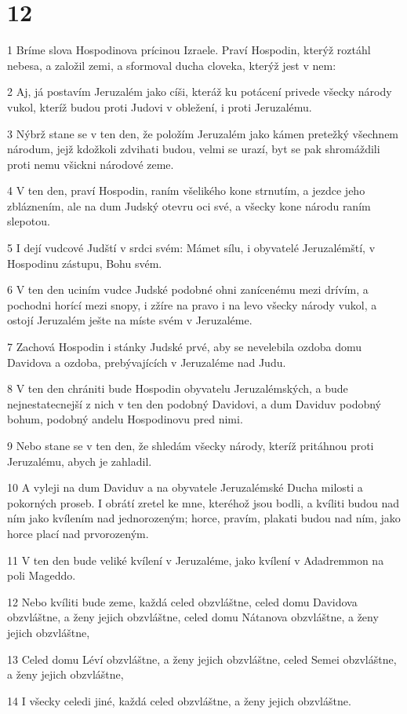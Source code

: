\chapter{12}

\par 1 Bríme slova Hospodinova prícinou Izraele. Praví Hospodin, kterýž roztáhl nebesa, a založil zemi, a sformoval ducha cloveka, kterýž jest v nem:
\par 2 Aj, já postavím Jeruzalém jako cíši, kteráž ku potácení privede všecky národy vukol, kteríž budou proti Judovi v obležení, i proti Jeruzalému.
\par 3 Nýbrž stane se v ten den, že položím Jeruzalém jako kámen pretežký všechnem národum, jejž kdožkoli zdvihati budou, velmi se urazí, byt se pak shromáždili proti nemu všickni národové zeme.
\par 4 V ten den, praví Hospodin, raním všelikého kone strnutím, a jezdce jeho zbláznením, ale na dum Judský otevru oci své, a všecky kone národu raním slepotou.
\par 5 I dejí vudcové Judští v srdci svém: Mámet sílu, i obyvatelé Jeruzalémští, v Hospodinu zástupu, Bohu svém.
\par 6 V ten den uciním vudce Judské podobné ohni zanícenému mezi drívím, a pochodni horící mezi snopy, i zžíre na pravo i na levo všecky národy vukol, a ostojí Jeruzalém ješte na míste svém v Jeruzaléme.
\par 7 Zachová Hospodin i stánky Judské prvé, aby se nevelebila ozdoba domu Davidova a ozdoba, prebývajících v Jeruzaléme nad Judu.
\par 8 V ten den chrániti bude Hospodin obyvatelu Jeruzalémských, a bude nejnestatecnejší z nich v ten den podobný Davidovi, a dum Daviduv podobný bohum, podobný andelu Hospodinovu pred nimi.
\par 9 Nebo stane se v ten den, že shledám všecky národy, kteríž pritáhnou proti Jeruzalému, abych je zahladil.
\par 10 A vyleji na dum Daviduv a na obyvatele Jeruzalémské Ducha milosti a pokorných proseb. I obrátí zretel ke mne, kteréhož jsou bodli, a kvíliti budou nad ním jako kvílením nad jednorozeným; horce, pravím, plakati budou nad ním, jako horce plací nad prvorozeným.
\par 11 V ten den bude veliké kvílení v Jeruzaléme, jako kvílení v Adadremmon na poli Mageddo.
\par 12 Nebo kvíliti bude zeme, každá celed obzvláštne, celed domu Davidova obzvláštne, a ženy jejich obzvláštne, celed domu Nátanova obzvláštne, a ženy jejich obzvláštne,
\par 13 Celed domu Léví obzvláštne, a ženy jejich obzvláštne, celed Semei obzvláštne, a ženy jejich obzvláštne,
\par 14 I všecky celedi jiné, každá celed obzvláštne, a ženy jejich obzvláštne.

